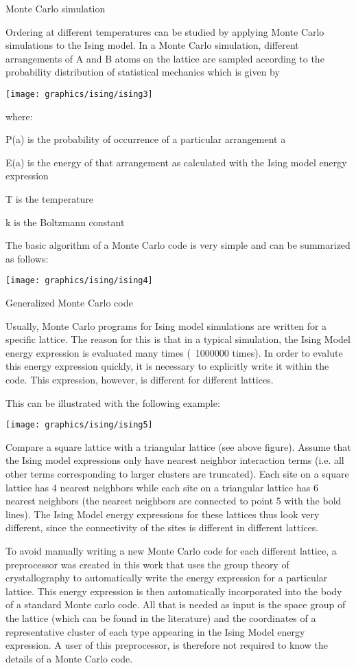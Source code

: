 Monte Carlo simulation

Ordering at different temperatures can be studied by applying Monte
Carlo simulations to the Ising model. In a Monte Carlo simulation,
different arrangements of A and B atoms on the lattice are sampled
according to the probability distribution of statistical mechanics
which is given by

\texttt{[image: graphics/ising/ising3]}

where:

P(a) is the probability of occurrence of a particular arrangement a

E(a) is the energy of that arrangement as calculated with the Ising model energy expression

T is the temperature

k is the Boltzmann constant

The basic algorithm of a Monte Carlo code is very simple and can be
summarized as follows:

\texttt{[image: graphics/ising/ising4]}

Generalized Monte Carlo code

Usually, Monte Carlo programs for Ising model simulations are written
for a specific lattice. The reason for this is that in a typical
simulation, the Ising Model energy expression is evaluated many times
(~1000000 times). In order to evalute this energy expression quickly,
it is necessary to explicitly write it within the code. This
expression, however, is different for different lattices.

This can be illustrated with the following example:

\texttt{[image: graphics/ising/ising5]}

Compare a square lattice with a triangular lattice (see above
figure). Assume that the Ising model expressions only have nearest
neighbor interaction terms (i.e. all other terms corresponding to
larger clusters are truncated). Each site on a square lattice has 4
nearest neighbors while each site on a triangular lattice has 6
nearest neighbors (the nearest neighbors are connected to point 5 with
the bold lines). The Ising Model energy expressions for these lattices
thus look very different, since the connectivity of the sites is
different in different lattices.

To avoid manually writing a new Monte Carlo code for each different
lattice, a preprocessor was created in this work that uses the group
theory of crystallography to automatically write the energy expression
for a particular lattice. This energy expression is then automatically
incorporated into the body of a standard Monte carlo code. All that is
needed as input is the space group of the lattice (which can be found
in the literature) and the coordinates of a representative cluster of
each type appearing in the Ising Model energy expression. A user of
this preprocessor, is therefore not required to know the details of a
Monte Carlo code.

